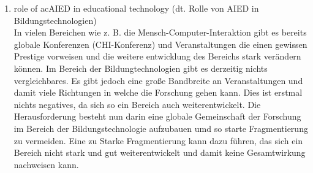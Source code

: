 \begin{enumerate}
    
    \item role of ac{AIED} in educational technology (dt. Rolle von \ac{AIED} in Bildungstechnologien) \\
    In vielen Bereichen wie z. B. die Mensch-Computer-Interaktion gibt es bereits globale Konferenzen (CHI-Konferenz) und Veranstaltungen die einen gewissen Prestige vorweisen und die weitere entwicklung des Bereichs stark verändern können.
    Im Bereich der Bildungtechnologien gibt es derzeitig nichts vergleichbares. Es gibt jedoch eine große Bandbreite an Veranstaltungen und damit viele Richtungen in welche die Forschung gehen kann. Dies ist erstmal nichts negatives, da sich so ein Bereich auch weiterentwickelt.
    Die Herausforderung besteht nun darin eine globale Gemeinschaft der Forschung im Bereich der Bildungstechnologie aufzubauen umd so starte Fragmentierung zu vermeiden.
    Eine zu Starke Fragmentierung kann dazu führen, das sich ein Bereich nicht stark und gut weiterentwickelt und damit keine Gesamtwirkung nachweisen kann. \cite[S. 12]{Pinkwart.2016}
\end{enumerate} 